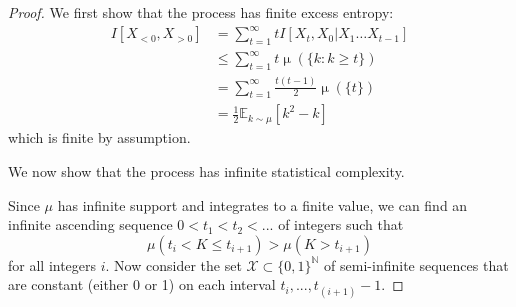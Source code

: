 \documentclass[11pt,letterpaper]{article}
\newcommand{\E}[0]{\mathbb{E}}
\begin{document}
\begin{proof}
We first show that the process has finite excess entropy:
\begin{align*}
I[X_{<0}, X_{>0}] &= \sum_{t=1}^\infty t I[X_t, X_0|X_1\dots X_{t-1}] \\
& \leq \sum_{t=1}^\infty t \operatorname{\mu}(\{k : k \geq t\}) \\
&= \sum_{t=1}^\infty \frac{t(t-1)}{2} \operatorname{\mu}(\{t\}) \\
&= \frac{1}{2} \E_{k \sim \mu} \left[k^2-k\right]
\end{align*}
which is finite by assumption.

We now show that the process has infinite statistical complexity.



Since $\mu$ has infinite support and integrates to a finite value, we can find an infinite ascending sequence $0 < t_1 < t_2 < ...$ of integers such that
$$\mu\left(t_i < K \leq t_{i+1}\right) > \mu(K > t_{i+1})$$
for all integers $i$.
Now consider the set $\mathcal{X} \subset \{0,1\}^{\mathbb{N}}$ of semi-infinite sequences that are constant (either 0 or 1) on each interval $t_i, ..., t_{(i+1)}-1$.


\end{proof}
\end{document}
